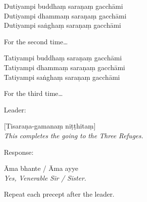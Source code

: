 Dutiyampi buddhaṃ saraṇaṃ gacchāmi\\
Dutiyampi dhammaṃ saraṇaṃ gacchāmi\\
Dutiyampi saṅghaṃ saraṇaṃ gacchāmi

\begin{english}
  For the second time\ldots
\end{english}

Tatiyampi buddhaṃ saraṇaṃ gacchāmi\\
Tatiyampi dhammaṃ saraṇaṃ gacchāmi\\
Tatiyampi saṅghaṃ saraṇaṃ gacchāmi

\begin{english}
  For the third time\ldots
\end{english}

\begin{instruction}
  Leader:
\end{instruction}

[Tisaraṇa-gamanaṃ niṭṭhitaṃ]\\
\emph{This completes the going to the Three Refuges.}

\begin{instruction}
  Response:
\end{instruction}

Āma bhante / Āma ayye\\
\emph{Yes, Venerable Sir / Sister.}

\begin{instruction}
  Repeat each precept after the leader.
\end{instruction}

\ifhandbookedition
\enlargethispage{-\baselineskip}
\fi

